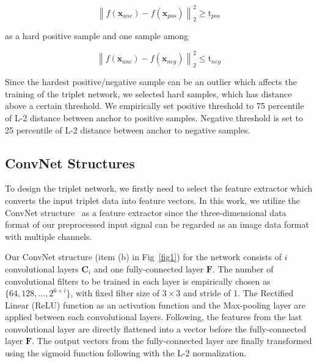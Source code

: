 \documentclass[runningheads]{llncs}
\begin{document}
\begin{equation}
    {\left\| {{f\left(\mathbf{x}_{anc}\right)} - {f\left(\mathbf{x}_{pos}\right)}} \right\|_2^2} \geq \mathrm{t}_{pos}
\end{equation}

as a hard positive sample and one sample among 

\begin{equation}
    {\left\| {{f\left(\mathbf{x}_{anc}\right)} - {f\left(\mathbf{x}_{neg}\right)}} \right\|_2^2} \leq \mathrm{t}_{neg}
\end{equation}

Since the hardest positive/negative sample can be an outlier which affects the training of the triplet network, we selected hard samples, which has distance above a certain threshold.
We empirically set positive threshold to 75 percentile of L-2 distance between anchor to positive samples. Negative threshold is set to 25 percentile of L-2 distance between anchor to negative samples.

\subsection{ConvNet Structures}

To design the triplet network, we firstly need to select the feature extractor which converts the input triplet data into feature vectors. In this work, we utilize the ConvNet structure~\cite{lecun1998gradient} as a feature extractor since the three-dimensional data format of our preprocessed input signal can be regarded as an image data format with multiple channels. 

Our ConvNet structure (item (b) in Fig~\ref{fig1}) for the network consists of $i$ convolutional layers $\mathbf{C}_{i}$ and one fully-connected layer $\mathbf{F}$. The number of convolutional filters to be trained in each layer is empirically chosen as $\{64, 128, ...,  2^{6+i}\}$, with fixed filter size of $3\times3$ and stride of 1. The Rectiﬁed Linear (ReLU) function as an activation function and the Max-pooling layer are applied between each convolutional layers. Following, the features from the last convolutional layer are directly flattened into a vector before the fully-connected layer $\mathbf{F}$.
The output vectors from the fully-connected layer are finally transformed using the sigmoid function following with the L-2 normalization.

\end{document}
